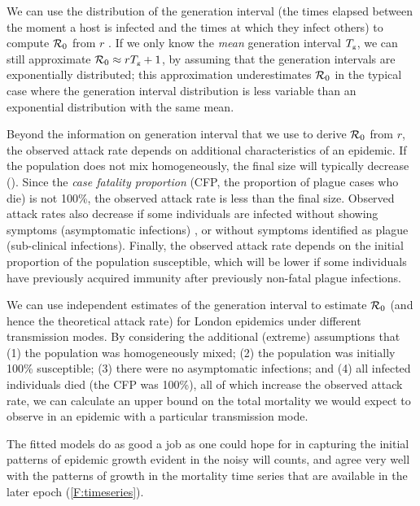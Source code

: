 We can use the distribution of the generation interval (the times elapsed between the moment a host is infected and the times at which they infect others) to compute ${\mathcal R}_0$ from $r$ \cite{WallLips07}. If we only know the \emph{mean} generation interval $T_{\mbox{\tiny g}}$, we can still approximate ${\mathcal R}_0 \approx r T_{\mbox{\tiny g}} +1$, by assuming that the generation intervals are exponentially distributed; this approximation underestimates ${\mathcal R}_0$ in the typical case where the generation interval distribution is less variable than an exponential distribution with the same mean.

Beyond the information on generation interval that we use to derive ${\mathcal R}_0$ from $r$, the observed attack rate depends on additional characteristics of an epidemic. If the population does not mix homogeneously, the final size will typically decrease (\eg \cite[Fig.\,6]{Roll+15}). Since the \emph{case fatality proportion} (CFP, the proportion of plague cases who die) is not 100\%, the observed attack rate is less than the final size. Observed attack rates also decrease if some individuals are infected without showing symptoms (asymptomatic infections) \cite{Mars+67}, or without symptoms identified as plague (sub-clinical infections). Finally, the observed attack rate depends on the initial proportion of the population susceptible, which will be lower if some individuals have previously acquired immunity after previously non-fatal plague infections. 

We can use independent estimates of the generation interval to estimate ${\mathcal R}_0$ (and hence the theoretical attack rate) for London epidemics under different transmission modes. By considering the additional (extreme) assumptions that \hypertarget{4assumptions}{} (1) the population was homogeneously mixed; (2) the population was initially 100\% susceptible; (3) there were no asymptomatic infections; and (4) all infected individuals died (\ie the CFP was 100\%), all of which increase the observed attack rate, we can calculate an upper bound on the total mortality we would expect to observe in an epidemic with a particular transmission mode.


The fitted models do as good a job as one could hope for in capturing the initial patterns of epidemic growth evident in the noisy will counts, and agree very well with the patterns of growth in the mortality time series that are available in the later epoch (\cref{F:timeseries}).

